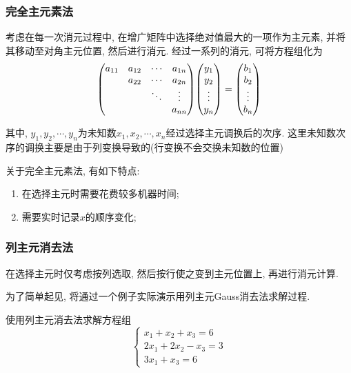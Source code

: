 \subsubsection{完全主元素法}

考虑在每一次消元过程中, 在增广矩阵中选择绝对值最大的一项作为主元素, 并将其移动至对角主元位置, 然后进行消元. 经过一系列的消元, 可将方程组化为
\begin{equation*}
    \mqty(
        a_{11}&a_{12}&\cdots&a_{1n}\\
        &a_{22}&\cdots&a_{2n}\\
        &&\ddots&\vdots\\
        &&&a_{nn}
    )\mqty(y_1\\y_2\\\vdots\\y_n)=\mqty(b_1\\b_2\\\vdots\\b_n)
\end{equation*}

其中, $y_1,y_2,\cdots,y_n$为未知数$x_1,x_2,\cdots,x_n$经过选择主元调换后的次序. 这里未知数次序的调换主要是由于列变换导致的(行变换不会交换未知数的位置)

关于完全主元素法, 有如下特点:
\begin{enumerate}
    \item 在选择主元时需要花费较多机器时间;
    \item 需要实时记录$x$的顺序变化;
\end{enumerate}

\subsubsection{列主元消去法}

在选择主元时仅考虑按列选取, 然后按行使之变到主元位置上, 再进行消元计算.

为了简单起见, 将通过一个例子实际演示用列主元Gauss消去法求解过程.

\begin{example}
    使用列主元消去法求解方程组
    \begin{equation*}
        \begin{cases}
            x_1+x_2+x_3=6\\
            2x_1+2x_2-x_3=3\\
            3x_1+x_3=6
        \end{cases}
    \end{equation*}
\end{example}

